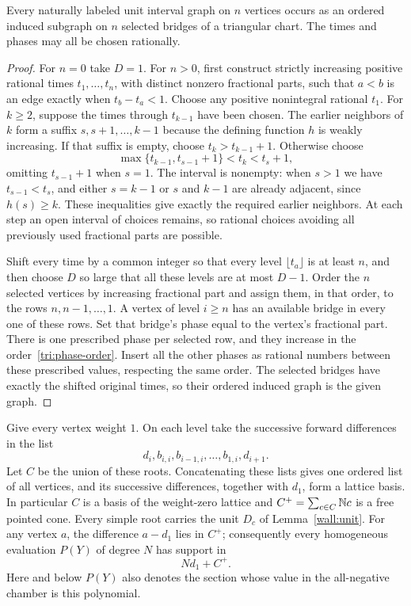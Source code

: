 \begin{lemma}[Embedding]\label{tri:embedding}
Every naturally labeled unit interval graph on $n$ vertices occurs as
an ordered induced subgraph on $n$ selected bridges of a triangular
chart.  The times and phases may all be chosen rationally.
\end{lemma}

\begin{proof}
For $n=0$ take $D=1$.  For $n>0$, first construct strictly increasing
positive rational times
$t_1,\ldots,t_n$, with distinct nonzero fractional parts, such that
$a<b$ is an edge exactly when $t_b-t_a<1$.
Choose any positive nonintegral rational $t_1$.  For $k\geq2$, suppose
the times through $t_{k-1}$ have been chosen.  The earlier
neighbors of $k$ form a suffix $s,s+1,\ldots,k-1$ because the defining
function $h$ is weakly increasing.  If that suffix is empty, choose
$t_k>t_{k-1}+1$.  Otherwise choose
\[
 \max\{t_{k-1},t_{s-1}+1\}<t_k<t_s+1,
\]
omitting $t_{s-1}+1$ when $s=1$.
The interval is nonempty: when $s>1$ we have $t_{s-1}<t_s$, and either $s=k-1$ or
$s$ and $k-1$ are already adjacent, since $h(s)\geq k$.
These inequalities give exactly the required earlier neighbors.
At each step an open interval of choices remains, so rational choices
avoiding all previously used fractional parts are possible.

Shift every time by a common integer so that every level
$\lfloor t_a\rfloor$ is at least $n$, and then choose $D$ so large that
all these levels are at most $D-1$.  Order the $n$ selected vertices by
increasing fractional part and assign them, in that order, to the rows
$n,n-1,\ldots,1$.  A vertex of level $i\geq n$ has an available bridge
in every one of these rows.  Set that bridge's phase equal to the
vertex's fractional part.  There is one prescribed phase per selected
row, and they increase in the order~\eqref{tri:phase-order}.
Insert all the other phases as rational numbers between these prescribed
values, respecting the same order.  The selected bridges have exactly
the shifted original times, so their ordered induced graph is the
given graph.
\end{proof}

Give every vertex weight $1$.  On each level take the successive
forward differences in the list
\begin{equation}\label{tri:level-list}
 d_i,b_{i,i},b_{i-1,i},\ldots,b_{1,i},d_{i+1}.
\end{equation}
Let $C$ be the union of these roots.  Concatenating these lists gives
one ordered list of all vertices, and its successive differences,
together with $d_1$, form a lattice basis.  In particular $C$ is a
basis of the weight-zero lattice and
$C^+=\sum_{c\in C}\mathbb N c$ is a free pointed cone.
Every simple root carries the unit $D_c$ of
Lemma~\ref{wall:unit}.
For any vertex $a$, the difference $a-d_1$ lies in $C^+$; consequently
every homogeneous evaluation $P(Y)$ of degree $N$ has support in
\begin{equation}\label{tri:support-cone}
 Nd_1+C^+.
\end{equation}
Here and below $P(Y)$ also denotes the section whose value in the
all-negative chamber is this polynomial.

